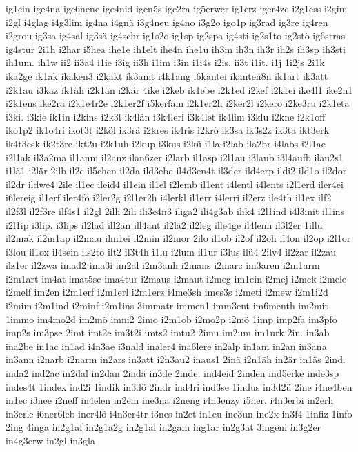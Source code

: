 {ig1ein
ige4na
ige6nene
ige4nid
igen5s
ige2ra
ig5erwer
ig1erz
iger4ze
i2g1ess
i2gim
i2gl
i4glag
i4g3lim
ig4na
i4gnä
i3g4neu
ig4no
i3g2o
igo1p
ig3rad
ig3re
ig4ren
i2grou
ig3sa
ig4sal
ig3sä
ig4schr
ig1s2o
ig1sp
ig2spa
ig4sti
ig2s1to
ig2stö
ig6stras
ig4stur
2i1h
i2har
i5hea
ihe1e
ih1elt
ihe4n
ihe1u
ih3m
ih3n
ih3r
ih2s
ih3sp
ih3sti
ih1um.
ih1w
ii2
ii3a4
i1ie
i3ig
ii3h
i1im
i3in
i1i4s
i2is.
ii3t
i1it.
i1j
1i2js
2i1k
ika2ge
ik1ak
ikaken3
i2kakt
ik3amt
i4k1ang
i6kantei
ikanten8n
ik1art
ik3att
i2k1au
i3kaz
ik1äh
i2k1än
i2kär
4ike
i2keb
ik1ebe
i2k1ed
i2kef
i2k1ei
ike4l1
ike2n1
i2k1ens
ike2ra
i2k1e4r2e
i2k1er2f
i5kerfam
i2k1er2h
i2ker2l
i2kero
i2ke3ru
i2k1eta
i3ki.
i3kie
ik1in
i2kins
i2k3l
ik4län
i3k4leri
i3k4let
ik4lim
i3klu
i2kne
i2k1off
iko1p2
ik1o4ri
ikot3t
i2köl
ik3rä
i2kres
ik4ris
i2krö
ik3sa
ik3s2z
ik3ta
ikt3erk
ik4t3esk
ik2t3re
ikt2u
i2k1uh
i2kup
i3kus
i2kü
i1la
i2lab
ila2br
i4labs
i2l1ac
i2l1ak
il3a2ma
il1anm
il2anz
ilan6zer
i2larb
il1asp
i2l1au
i3laub
i3l4aufb
ilau2s1
i1lä1
i2lär
2ilb
il2c
il5chen
il2da
ild3ebe
il4d3en4t
il3der
ild4erp
ildi2
ild1o
il2dor
il2dr
ildwe4
2ile
il1ec
ileid4
il1ein
il1el
i2lemb
il1ent
i4lentl
i4lents
i2l1erd
iler4ei
i6lereig
il1erf
iler4fo
i2ler2g
i2l1er2h
i4lerkl
il1err
i4lerri
il2erz
ile4th
il1ex
ilf2
il2f3l
il2f3re
ilf4s1
il2gl
2ilh
2ili
ili3e4n3
iliga2
ili4g3ab
ilik4
i2l1ind
i4l3init
il1ins
i2l1ip
i3lip.
i3lips
il2lad
ill2an
ill4ant
il2lä2
il2leg
ille4ge
il4lenn
il3l2er
1illu
il2mak
il2m1ap
il2mau
ilm1ei
il2min
il2mor
2ilo
il1ob
il2of
il2oh
il4on
il2op
i2l1or
i3lou
il1ox
il4sein
ils2to
ilt2
il3t4h
i1lu
i2lum
il1ur
i3lus
ilü4
2ilv4
il2zar
il2zau
ilz1er
il2zwa
imad2
ima3i
im2al
i2m3anh
i2mans
i2marc
im3aren
i2m1arm
i2m1art
im4at
imat5sc
ima4tur
i2maus
i2maut
i2meg
im1ein
i2mej
i2mek
i2mele
i2melf
im2en
i2m1erf
i2m1erl
i2m1erz
i4me3sh
imes3s
i2meti
i2mew
i2m1i2d
i2mim
i2m1ind
i2minf
i2m1ins
3immatr
immen1
imm3ent
im6menth
im2mit
1immo
im4mo2d
im2mö
imni2
2imo
i2m1ob
i2mo2p
i2mö
1imp
imp2fa
im3pfo
imp2s
im3pse
2imt
imt2e
im3t2i
imts2
imtu2
2imu
im2um
im1urk
2in.
in3ab
ina2be
in1ac
in1ad
i4n3ae
i3nald
inaler4
ina6lere
in2alp
in1am
in2an
in3ana
in3ann
i2narb
i2narm
in2ars
in3att
i2n3au2
inaus1
2inä
i2n1äh
in2är
in1äs
2ind.
inda2
ind2ac
in2dal
in2dan
2indä
in3de
2inde.
ind4eid
2inden
ind5erke
inde3sp
indes4t
1index
ind2i
1indik
in3dö
2indr
ind4ri
ind3se
1indus
in3d2ü
2ine
i4ne4ben
in1ec
i3nee
i2neff
in4elen
in2em
ine3nä
i2neng
i4n3enzy
i5ner.
i4n3erbi
in2erh
in3erle
i6ner6leb
iner4lö
i4n3er4tr
i3nes
in2et
in1eu
ine3un
ine2x
in3f4
1infiz
1info
2ing
4inga
in2g1af
in2g1a2g
in2g1al
in2gam
ing1ar
in2g3at
3ingeni
in3g2er
in4g3erw
in2gl
in3gla
}
